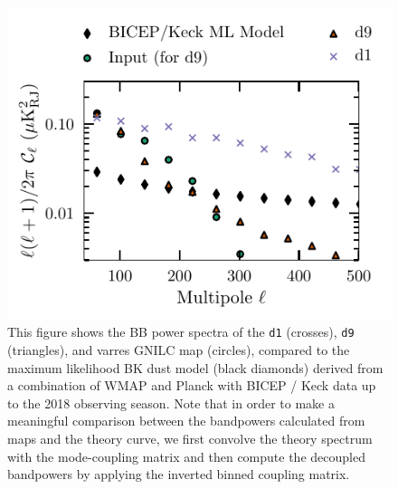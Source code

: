 \documentclass[twocolumn]{aastex631}
\newcommand{\done}{{\tt d1}}
\newcommand{\dnine}{{\tt d9}}
\begin{document}
\begin{figure}[ht]
    \centering
    \includegraphics{paper_BK_patch.pdf}
    \caption{This figure shows the BB power spectra of the \done{} (crosses), \dnine{} (triangles), and varres GNILC map (circles), compared to the maximum likelihood BK dust model (black diamonds) derived from a combination of WMAP and Planck with BICEP / Keck data up to the 2018 observing season. Note that in order to make a meaningful comparison between the bandpowers calculated from maps and the theory curve, we first convolve the theory spectrum with the mode-coupling matrix and then compute the decoupled bandpowers by applying the inverted binned coupling matrix.}
    \label{fig:d1d9_bkpatch}
\end{figure}

\end{document}
